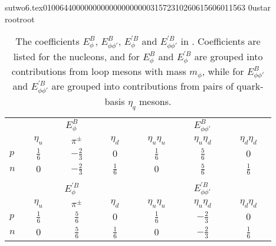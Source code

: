                                                                                                                                                                                                                                                                                       sutwo6.tex                                                                                          0100644 0000000 0000000 00000315723 10260615606 011563  0                                                                                                    ustar   root                            root                                                                                                                                                                                                                   \documentclass[prd,amssymb,amsmath,showpacs,nofootinbib,superscriptaddress]{revtex4}
\begin{document}
\begin{table}[ht]
\caption{The coefficients $E^B_\phi$, $E^B_{\phi\phi'}$, $E^{\prime
    B}_\phi$ and $E^{\prime B}_{\phi \phi'}$ in \PQCPT. Coefficients
  are listed for the nucleons, and for $E^B_\phi$ and $E^{\prime
    B}_\phi$ are grouped into contributions from loop mesons with mass
  $m_\phi$, while for $E^B_{\phi\phi'}$ and $E^{\prime B}_{\phi
    \phi'}$ are grouped into contributions from pairs of quark-basis
  $\eta_q$ mesons.}
\begin{tabular}{l | c c c | c  c c}
& \multicolumn{3}{c|}{$E^B_\phi \phantom{ap}$} & \multicolumn{3}{c}{$E^B_{\phi\phi'}$ \phantom{sp}} \\
& $\quad \eta_u \quad$ & $\quad \pi^\pm \quad $ & $\quad \eta_d \quad $  
& $\quad \eta_u \eta_u \quad$ & $\quad \eta_u \eta_d \quad $& $\quad \eta_d \eta_d \quad$ \\
\hline
$p$       
           &  $\frac{1}{6}$ & $-\frac{2}{3}$  & $0$ 
           &  $\frac{1}{6}$ & $ \frac{5}{6}$  & $0$ \\

$n$ 
           &  $0$ & $-\frac{2}{3}$  & $\frac{1}{6}$ 
           &  $0$ & $ \frac{5}{6}$  & $\frac{1}{6}$ \\

\multicolumn{6}{c}{}
\\
& \multicolumn{3}{c|}{$E^{\prime B}_\phi \phantom{ap}$} & \multicolumn{3}{c}{$E^{\prime B}_{\phi\phi'}$ \phantom{sp}} \\
& $\quad \eta_u \quad$ & $\quad \pi^\pm \quad $ & $\quad \eta_d \quad $  
& $\quad \eta_u \eta_u \quad$ & $\quad \eta_u \eta_d \quad $& $\quad \eta_d \eta_d \quad$ \\
\hline
$p$       
           &  $\frac{1}{6}$ & $ \frac{5}{6}$  & $0$ 
           &  $\frac{1}{6}$ & $-\frac{2}{3}$  & $0$ \\

$n$ 
           &  $0$ & $ \frac{5}{6}$  & $\frac{1}{6}$ 
           &  $0$ & $-\frac{2}{3}$  & $\frac{1}{6}$ \\
\end{tabular}
\label{t:NPQQCD-E}
\end{table}
\endgroup
\end{document}
